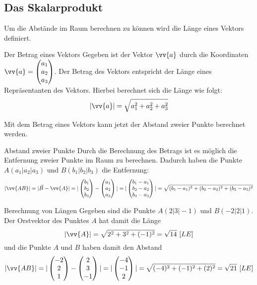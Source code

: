 \subsection{Das Skalarprodukt}
Um die Abstände im Raum berechnen zu können wird die Länge eines Vektors definiert.
\begin{defi}{Der Betrag eines Vektors}{}
Gegeben ist der Vektor $\vv{a}$ durch die Koordinaten $\vv{a} = \begin{pmatrix} a_1 \\a_2 \\a_3\end{pmatrix}$. Der Betrag des Vektors entspricht der Länge eines Repräsentanten des Vektors. Hierbei berechnet sich die Länge wie folgt: $$|\vv{a}| = \sqrt{a_1^2 + a_2^2 + a_3^2}$$
\end{defi}
Mit dem Betrag eines Vektors kann jetzt der Abstand zweier Punkte berechnet werden.
\begin{merke}{Abstand zweier Punkte}{}
Durch die Berechnung des Betrags ist es möglich die Entfernung zweier Punkte im Raum zu berechnen. Dadurch haben die Punkte $A(a_1|a_2|a_3)$ und $B(b_1|b_2|b_3)$ die Entfernung: $$|\vv{AB}|=|\vec{B} - \vv{A}| = | \begin{pmatrix} b_1 \\b_2 \\b_3\end{pmatrix} -\begin{pmatrix} a_1 \\a_2 \\a_3\end{pmatrix}| = |\begin{pmatrix} b_1 - a_1 \\b_2 - a_2 \\b_3- a_3\end{pmatrix}| =\sqrt{(b_1-a_1)^2+ (b_2-a_2)^2 + (b_3-a_3)^2}$$
\end{merke}
\begin{bsp}{Berechnung von Längen}{}
Gegeben sind die Punkte $A(2|3|-1)$ und $B(-2|2|1)$. Der Orstvektor des Punktes $A$ hat damit die Länge $$|\vv{A}| = \sqrt{2^2 +3^2 +(-1)^2} = \sqrt{14}\ [LE]$$ und die Punkte $A$ und $B$ haben damit den Abstand $$|\vv{AB}| = |\begin{pmatrix} -2 \\2 \\1\end{pmatrix} - \begin{pmatrix} 2 \\3 \\-1\end{pmatrix}| = |\begin{pmatrix} -4 \\-1 \\2\end{pmatrix}| = \sqrt{(-4)^2 +(-1)^2 + (2)^2} = \sqrt{21} \ [LE]$$
\end{bsp}
